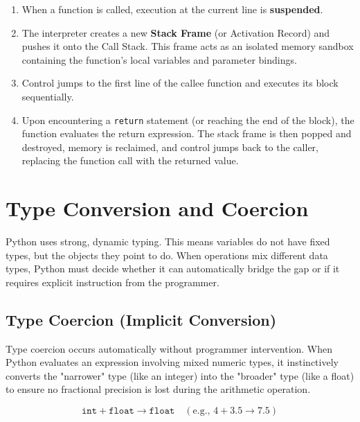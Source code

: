 \begin{enumerate}[leftmargin=1.5em]
    \item When a function is called, execution at the current line is \textbf{suspended}.
    \item The interpreter creates a new \textbf{Stack Frame} (or Activation Record) and pushes it onto the Call Stack. This frame acts as an isolated memory sandbox containing the function's local variables and parameter bindings.
    \item Control jumps to the first line of the callee function and executes its block sequentially.
    \item Upon encountering a \texttt{return} statement (or reaching the end of the block), the function evaluates the return expression. The stack frame is then popped and destroyed, memory is reclaimed, and control jumps back to the caller, replacing the function call with the returned value.
\end{enumerate}

\section{Type Conversion and Coercion}

Python uses strong, dynamic typing. This means variables do not have fixed types, but the objects they point to do. When operations mix different data types, Python must decide whether it can automatically bridge the gap or if it requires explicit instruction from the programmer.

\subsection{Type Coercion (Implicit Conversion)}
Type coercion occurs automatically without programmer intervention. When Python evaluates an expression involving mixed numeric types, it instinctively converts the "narrower" type (like an integer) into the "broader" type (like a float) to ensure no fractional precision is lost during the arithmetic operation.

\begin{equation*}
    \texttt{int} + \texttt{float} \longrightarrow \texttt{float} \quad (\text{e.g., } 4 + 3.5 \to 7.5)
\end{equation*}

